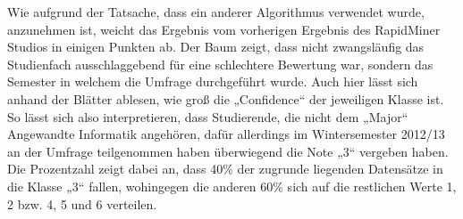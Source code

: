 Wie aufgrund der Tatsache, dass ein anderer Algorithmus verwendet wurde,
anzunehmen ist, weicht das Ergebnis vom vorherigen Ergebnis des RapidMiner
Studios in einigen Punkten ab. Der Baum zeigt, dass nicht zwangsläufig das
Studienfach ausschlaggebend für eine schlechtere Bewertung war, sondern das
Semester in welchem die Umfrage durchgeführt wurde.
Auch hier lässt sich anhand der Blätter ablesen, wie groß die „Confidence“ der
jeweiligen Klasse ist. So lässt sich also interpretieren, dass Studierende, die
nicht dem „Major“ Angewandte Informatik angehören, dafür allerdings im
Wintersemester 2012/13 an der Umfrage teilgenommen haben überwiegend die Note
„3“ vergeben haben. Die Prozentzahl zeigt dabei an, dass 40\% der zugrunde
liegenden Datensätze in die Klasse „3“ fallen, wohingegen die anderen 60\%
sich auf die restlichen Werte 1, 2 bzw. 4, 5 und 6 verteilen.
